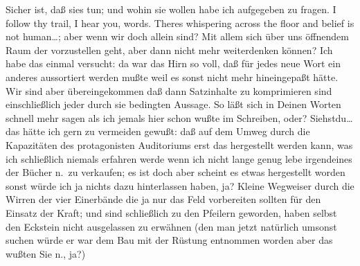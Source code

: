 \documentclass[
]{article}
\begin{document}
Sicher ist, daß sies tun; und wohin sie wollen habe ich aufgegeben zu
fragen. I follow thy trail, I hear you, words. Theres whispering across
the floor and belief is not human\ldots; aber wenn wir doch allein sind?
Mit allem sich über uns öffnendem Raum der vorzustellen geht, aber dann
nicht mehr weiterdenken können? Ich habe das einmal versucht: da war das
Hirn so voll, daß für jedes neue Wort ein anderes aussortiert werden
mußte weil es sonst nicht mehr hineingepaßt hätte.\\
Wir sind aber übereingekommen daß dann Satzinhalte zu komprimieren sind
einschließlich jeder durch sie bedingten Aussage. So läßt sich in Deinen
Worten schnell mehr sagen als ich jemals hier schon wußte im Schreiben,
oder? Siehstdu\ldots{} das hätte ich gern zu vermeiden gewußt: daß auf
dem Umweg durch die Kapazitäten des protagonisten Auditoriums erst das
hergestellt werden kann, was ich schließlich niemals erfahren werde wenn
ich nicht lange genug lebe irgendeines der Bücher n.~zu verkaufen; es
ist doch aber scheint es etwas hergestellt worden sonst würde ich ja
nichts dazu hinterlassen haben, ja? Kleine Wegweiser durch die Wirren
der vier Einerbände die ja nur das Feld vorbereiten sollten für den
Einsatz der Kraft; und sind schließlich zu den Pfeilern geworden, haben
selbst den Eckstein nicht ausgelassen zu erwähnen (den man jetzt
natürlich umsonst suchen würde er war dem Bau mit der Rüstung entnommen
worden aber das wußten Sie n., ja?)
\end{document}
